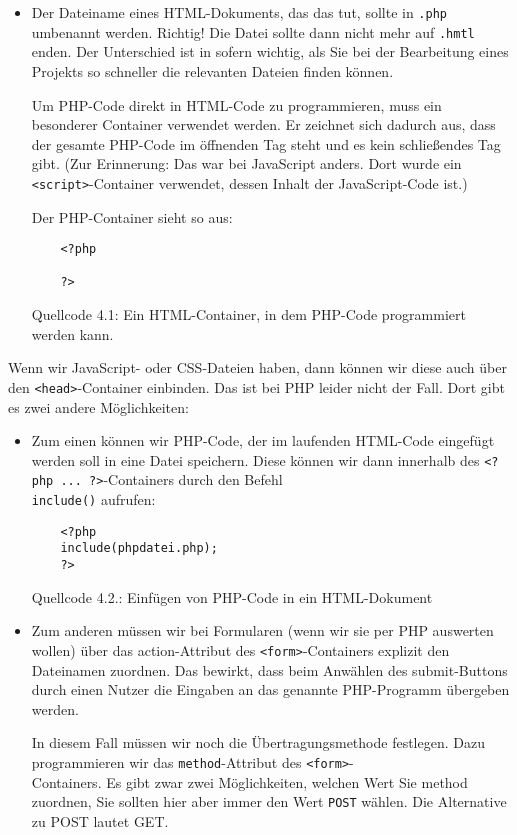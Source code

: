 \begin{itemize}
	\item Der Dateiname eines HTML-Dokuments, das das tut, sollte in \verb|.php| umbenannt werden. Richtig! Die Datei sollte dann nicht mehr auf  \verb|.hmtl| enden. Der Unterschied ist in sofern wichtig, als Sie bei der Bearbeitung eines Projekts so schneller die relevanten Dateien finden können.
	
	Um PHP-Code direkt in HTML-Code zu programmieren, muss ein besonderer Container verwendet werden. Er zeichnet sich dadurch aus, dass der gesamte PHP-Code im öffnenden Tag steht und es kein schließendes Tag gibt. (Zur Erinnerung: Das war bei JavaScript anders. Dort wurde ein \verb|<script>|-Container verwendet, dessen Inhalt der JavaScript-Code ist.)

	Der PHP-Container sieht so aus:
	\begin{verbatim}
	<?php
	
	?>	
	\end{verbatim}
	Quellcode 4.1: Ein HTML-Container, in dem PHP-Code programmiert werden kann.
\end{itemize}

Wenn wir JavaScript- oder CSS-Dateien haben, dann können wir diese auch über den \verb|<head>|-Container einbinden. Das ist bei PHP leider nicht der Fall. Dort gibt es zwei andere Möglichkeiten:

\begin{itemize}
	\item Zum einen können wir PHP-Code, der im laufenden HTML-Code eingefügt werden soll in eine Datei speichern. Diese können wir dann innerhalb des \verb|<?php ... ?>|-Containers durch den Befehl\\ \verb|include()| aufrufen:
	
	\begin{verbatim}
	<?php
	include(phpdatei.php);
	?>	
	\end{verbatim}
	Quellcode 4.2.: Einfügen von PHP-Code in ein HTML-Dokument

	\item Zum anderen müssen wir bei Formularen (wenn wir sie per PHP auswerten wollen) über das action-Attribut des \verb|<form>|-Containers explizit den Dateinamen zuordnen. Das bewirkt, dass beim Anwählen des submit-Buttons durch einen Nutzer die Eingaben an das genannte PHP-Programm übergeben werden.

	In diesem Fall müssen wir noch die Übertragungsmethode festlegen. Dazu programmieren wir das \verb|method|-Attribut des \verb|<form>|-\\Containers. Es gibt zwar zwei Möglichkeiten, welchen Wert Sie method zuordnen, Sie sollten hier aber immer den Wert \verb|POST| wählen. Die Alternative zu POST lautet GET.
\end{itemize}

